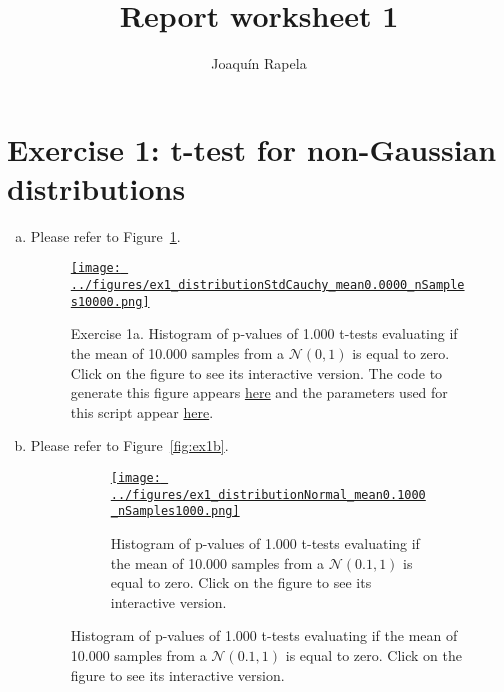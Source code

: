 \documentclass{article}
\title{Report worksheet 1}
\author{Joaqu\'{i}n Rapela}
\begin{document}
\maketitle

\section*{Exercise 1: t-test for non-Gaussian distributions}

\begin{enumerate}[(a)]

    \item  Please refer to Figure~\ref{fig:ex1a}.

        \begin{figure}
            \begin{center}
                \href{https://www.gatsby.ucl.ac.uk/~rapela/neuroinformatics/2023/ws1/figures/ex1_distributionNormal_popmean0.0000_mean0.0000_nSamples10000.html}{\texttt{[image: ../figures/ex1\_distributionStdCauchy\_mean0.0000\_nSamples10000.png]}}

                \caption{Exercise 1a. Histogram of p-values of 1.000 t-tests
                evaluating if the mean of 10.000 samples from a $\mathcal{N}(0,
                1)$ is equal to zero.
                Click on the figure to see its interactive version.
                The code to generate this figure appears
                \href{https://github.com/joacorapela/neuroinformatics23/blob/master/worksheets/ws1/mySolution/code/scripts/doEx1.py}{here} and the
                parameters used for this script appear
                \href{https://github.com/joacorapela/neuroinformatics23/blob/master/worksheets/ws1/mySolution/code/scripts/doEx1a.csh}{here}.}

                \label{fig:ex1a}

            \end{center}
        \end{figure}

    \item  Please refer to Figure~\ref{fig:ex1b}.

        \begin{figure}
            \begin{center}

                \begin{subfigure}{1.0\textwidth}
                    \centering
                    \href{https://www.gatsby.ucl.ac.uk/~rapela/neuroinformatics/2023/ws1/figures/ex1_distributionNormal_mean0.1000_nSamples1000.html}{\texttt{[image: ../figures/ex1\_distributionNormal\_mean0.1000\_nSamples1000.png]}}
                    \caption{Histogram of p-values of 1.000 t-tests evaluating if the mean of 10.000 samples from a $\mathcal{N}(0.1, 1)$ is equal to zero.  Click on the figure to see its interactive version.}
                    \label{fig:ex1b_1}
                \end{subfigure}


\end{center}
\end{figure}
\end{enumerate}
\end{document}
